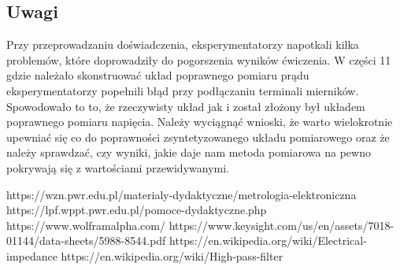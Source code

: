 \documentclass[11pt]{article}
\begin{document}
    \subsection*{Uwagi}
    Przy przeprowadzaniu doświadczenia, eksperymentatorzy napotkali kilka problemów, które doprowadziły do pogorszenia wyników ćwiczenia.
    W części 11 gdzie należało skonstruować układ poprawnego pomiaru prądu eksperymentatorzy popełnili błąd przy podłączaniu terminali mierników.
    Spowodowało to to, że rzeczywisty układ jak i został złożony był układem poprawnego pomiaru napięcia. Należy wyciągnąć wnioski, że warto
    wielokrotnie upewniać się co do poprawności zsyntetyzowanego układu pomiarowego oraz że należy sprawdzać, czy wyniki, jakie daje nam metoda
    pomiarowa na pewno pokrywają się z wartościami przewidywanymi.

    \vfill
    \footnotesize
    \begin{thebibliography}{9}
        https://wzn.pwr.edu.pl/materialy-dydaktyczne/metrologia-elektroniczna
        https://lpf.wppt.pwr.edu.pl/pomoce-dydaktyczne.php
        https://www.wolframalpha.com/
        https://www.keysight.com/us/en/assets/7018-01144/data-sheets/5988-8544.pdf
        https://en.wikipedia.org/wiki/Electrical-impedance
        https://en.wikipedia.org/wiki/High-pass-filter
    \end{thebibliography}
\end{document}
